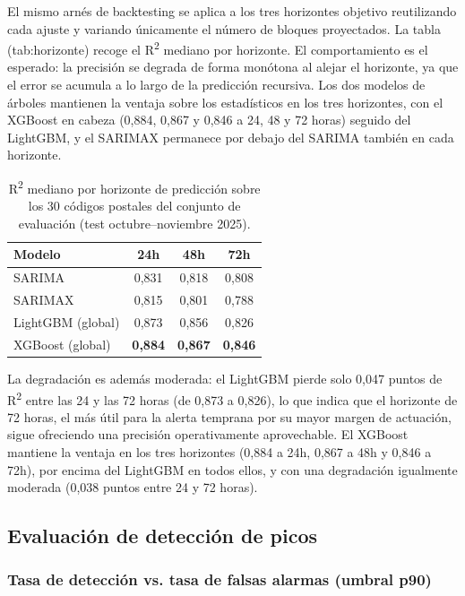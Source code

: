 \documentclass[12pt, a4paper]{article}
\begin{document}
El mismo arnés de backtesting se aplica a los tres horizontes objetivo reutilizando cada ajuste y variando únicamente el número de bloques proyectados. La tabla (tab:horizonte) recoge el R\textsuperscript{2} mediano por horizonte. El comportamiento es el esperado: la precisión se degrada de forma monótona al alejar el horizonte, ya que el error se acumula a lo largo de la predicción recursiva. Los dos modelos de árboles mantienen la ventaja sobre los estadísticos en los tres horizontes, con el XGBoost en cabeza (0,884, 0,867 y 0,846 a 24, 48 y 72 horas) seguido del LightGBM, y el SARIMAX permanece por debajo del SARIMA también en cada horizonte.


\begin{table}[htbp]
\centering
\caption{R\textsuperscript{2} mediano por horizonte de predicción sobre los 30 códigos postales del conjunto de evaluación (test octubre--noviembre 2025).}
\begin{tabular}{lccc}
\toprule
Modelo & 24h & 48h & 72h \\
\midrule
SARIMA & 0,831 & 0,818 & 0,808 \\
SARIMAX & 0,815 & 0,801 & 0,788 \\
LightGBM (global) & 0,873 & 0,856 & 0,826 \\
XGBoost (global) & \textbf{0,884} & \textbf{0,867} & \textbf{0,846} \\
\bottomrule
\end{tabular}
\end{table}


La degradación es además moderada: el LightGBM pierde solo 0,047 puntos de R\textsuperscript{2} entre las 24 y las 72 horas (de 0,873 a 0,826), lo que indica que el horizonte de 72 horas, el más útil para la alerta temprana por su mayor margen de actuación, sigue ofreciendo una precisión operativamente aprovechable. El XGBoost mantiene la ventaja en los tres horizontes (0,884 a 24h, 0,867 a 48h y 0,846 a 72h), por encima del LightGBM en todos ellos, y con una degradación igualmente moderada (0,038 puntos entre 24 y 72 horas).

\subsection{Evaluación de detección de picos}


\subsubsection{Tasa de detección vs. tasa de falsas alarmas (umbral p90)}
\end{document}
